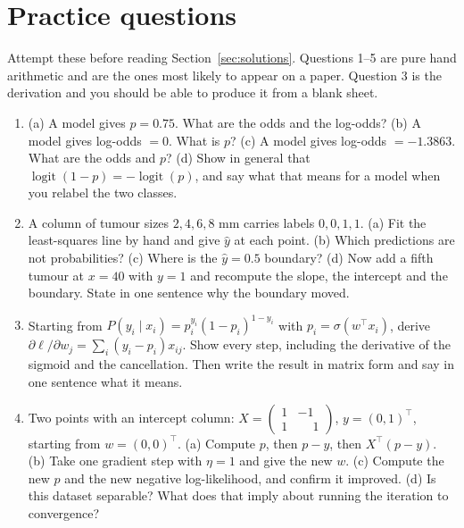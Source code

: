 \documentclass[11pt]{article}
\begin{document}
\section{Practice questions}
\label{sec:questions}

Attempt these before reading Section~\ref{sec:solutions}. Questions 1--5 are
pure hand arithmetic and are the ones most likely to appear on a paper.
Question 3 is the derivation and you should be able to produce it from a
blank sheet.

\begin{enumerate}[leftmargin=*]
  \item\label{q:odds} (a) A model gives $p = 0.75$. What are the odds and the
    log-odds? (b) A model gives log-odds $= 0$. What is $p$? (c) A model gives
    log-odds $=-1.3863$. What are the odds and $p$? (d) Show in general that
    $\operatorname{logit}(1-p) = -\operatorname{logit}(p)$, and say what that
    means for a model when you relabel the two classes.

  \item\label{q:line} A column of tumour sizes $2, 4, 6, 8$ mm carries labels
    $0, 0, 1, 1$. (a) Fit the least-squares line by hand and give $\hat y$ at
    each point. (b) Which predictions are not probabilities? (c) Where is the
    $\hat y = 0.5$ boundary? (d) Now add a fifth tumour at $x = 40$ with
    $y = 1$ and recompute the slope, the intercept and the boundary. State in
    one sentence why the boundary moved.

  \item\label{q:derive} Starting from
    $P(y_i \mid x_i) = p_i^{y_i}(1-p_i)^{1-y_i}$ with
    $p_i = \sigma(w^{\!\top}x_i)$, derive
    $\partial\ell/\partial w_j = \sum_i (y_i - p_i)x_{ij}$. Show every step,
    including the derivative of the sigmoid and the cancellation. Then write
    the result in matrix form and say in one sentence what it means.

  \item\label{q:step} Two points with an intercept column:
    $X = \begin{pmatrix} 1 & -1\\ 1 & \phantom{-}1 \end{pmatrix}$,
    $y = (0, 1)^{\!\top}$, starting from $w = (0,0)^{\!\top}$.
    (a) Compute $p$, then $p - y$, then $X^{\!\top}(p-y)$. (b) Take one
    gradient step with $\eta = 1$ and give the new $w$. (c) Compute the new
    $p$ and the new negative log-likelihood, and confirm it improved.
    (d) Is this dataset separable? What does that imply about running the
    iteration to convergence?


\end{enumerate}
\end{document}
